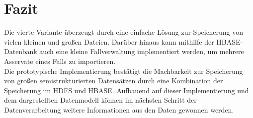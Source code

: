 \section{Fazit} 
Die vierte Variante überzeugt durch eine einfache Lösung zur Speicherung von vielen kleinen und großen Dateien. Darüber hinaus kann mithilfe der HBASE-Datenbank auch eine kleine Fallverwaltung implementiert werden, um mehrere Asservate eines Falls zu importieren.\\ Die prototypische Implementierung bestätigt die Machbarkeit zur Speicherung von großen semistrukturierten Datensätzen durch eine Kombination der Speicherung im HDFS und HBASE. Aufbauend auf dieser Implementierung und dem dargestellten Datenmodell können im nächsten Schritt der Datenverarbeitung weitere Informationen aus den Daten gewonnen werden. 